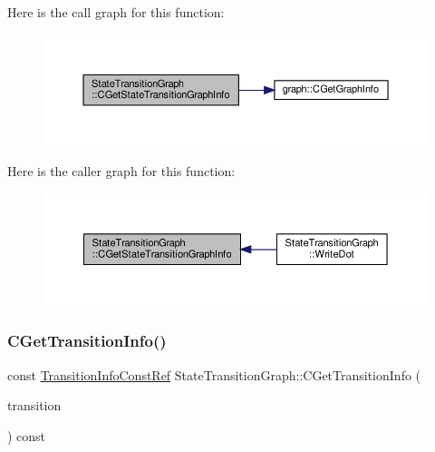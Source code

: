 Here is the call graph for this function\+:
\nopagebreak
\begin{figure}[H]
\begin{center}
\leavevmode
\includegraphics[width=350pt]{d9/d86/structStateTransitionGraph_a4b7434612d45f908dbd017de2aa0dc97_cgraph}
\end{center}
\end{figure}
Here is the caller graph for this function\+:
\nopagebreak
\begin{figure}[H]
\begin{center}
\leavevmode
\includegraphics[width=350pt]{d9/d86/structStateTransitionGraph_a4b7434612d45f908dbd017de2aa0dc97_icgraph}
\end{center}
\end{figure}
\mbox{\label{structStateTransitionGraph_a98cdb3dd6dbe46e3b19ef361d1c31e45}} 
\subsubsection{\texorpdfstring{C\+Get\+Transition\+Info()}{CGetTransitionInfo()}}
{\footnotesize\ttfamily const \hyperlink{state__transition__graph_8hpp_a64af31867580dfd7aed5d8b7d93062ae}{Transition\+Info\+Const\+Ref} State\+Transition\+Graph\+::\+C\+Get\+Transition\+Info (\begin{DoxyParamCaption}\item[{const \hyperlink{graph_8hpp_a9eb9afea34e09f484b21f2efd263dd48}{Edge\+Descriptor}}]{transition }\end{DoxyParamCaption}) const\hspace{0.3cm}{\ttfamily [inline]}}



